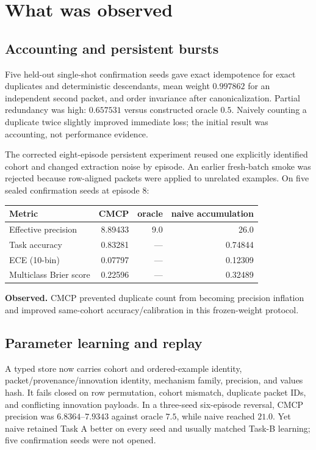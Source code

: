 \documentclass[11pt]{article}
\newcommand{\obs}{\textbf{Observed.} }
\begin{document}
\section{What was observed}
\subsection{Accounting and persistent bursts}
Five held-out single-shot confirmation seeds gave exact idempotence for exact duplicates and deterministic descendants, mean weight $0.997862$ for an independent second packet, and order invariance after canonicalization. Partial redundancy was high: $0.657531$ versus constructed oracle $0.5$. Naively counting a duplicate twice slightly improved immediate loss; the initial result was accounting, not performance evidence.

The corrected eight-episode persistent experiment reused one explicitly identified cohort and changed extraction noise by episode. An earlier fresh-batch smoke was rejected because row-aligned packets were applied to unrelated examples. On five sealed confirmation seeds at episode 8:
\begin{center}
\begin{tabular}{lrrr}\toprule
Metric & CMCP & oracle & naive accumulation\\\midrule
Effective precision & 8.89433 & 9.0 & 26.0\\
Task accuracy & 0.83281 & --- & 0.74844\\
ECE (10-bin) & 0.07797 & --- & 0.12309\\
Multiclass Brier score & 0.22596 & --- & 0.32489\\\bottomrule
\end{tabular}
\end{center}
\obs CMCP prevented duplicate count from becoming precision inflation and improved same-cohort accuracy/calibration in this frozen-weight protocol.

\subsection{Parameter learning and replay}
A typed store now carries cohort and ordered-example identity, packet/provenance/innovation identity, mechanism family, precision, and values hash. It fails closed on row permutation, cohort mismatch, duplicate packet IDs, and conflicting innovation payloads. In a three-seed six-episode reversal, CMCP precision was $6.8364$--$7.9343$ against oracle $7.5$, while naive reached $21.0$. Yet naive retained Task A better on every seed and usually matched Task-B learning; five confirmation seeds were not opened.
\end{document}
